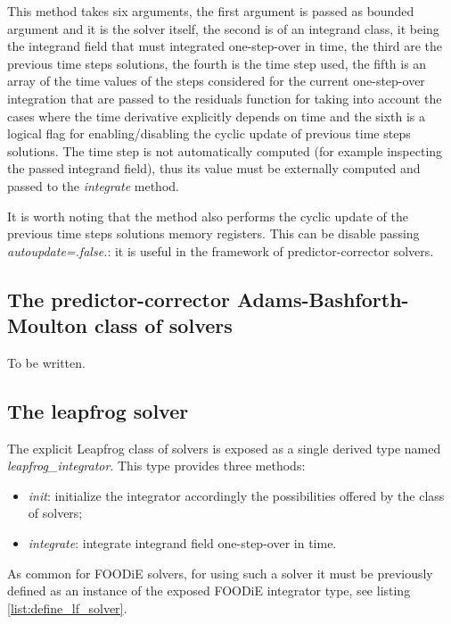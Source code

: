 This method takes six arguments, the first argument is passed as bounded argument and it is the solver itself, the second is of an integrand class, it being the integrand field that must integrated one-step-over in time, the third are the previous time steps solutions, the fourth is the time step used, the fifth is an array of the time values of the steps considered for the current one-step-over integration that are passed to the residuals function for taking into account the cases where the time derivative explicitly depends on time and the sixth is a logical flag for enabling/disabling the cyclic update of previous time steps solutions. The time step is not automatically computed (for example inspecting the passed integrand field), thus its value must be externally computed and passed to the \emph{integrate} method.

It is worth noting that the method also performs the cyclic update of the previous time steps solutions memory registers. This can be disable passing \emph{autoupdate=.false.}: it is useful in the framework of predictor-corrector solvers.

\subsection{The predictor-corrector Adams-Bashforth-Moulton class of solvers}\label{subsec:solver_abm}

{\color{red} To be written.}

\subsection{The leapfrog solver}\label{subsec:solver_leapfrog}

The explicit Leapfrog class of solvers is exposed as a single derived type named \emph{leapfrog\_integrator}. This type provides three methods:

\begin{itemize}
  \item \emph{init}: initialize the integrator accordingly the possibilities offered by the class of solvers;
  \item \emph{integrate}: integrate integrand field one-step-over in time.
  \end{itemize}

As common for FOODiE solvers, for using such a solver it must be previously defined as an instance of the exposed FOODiE integrator type, see listing \ref{list:define_lf_solver}.


